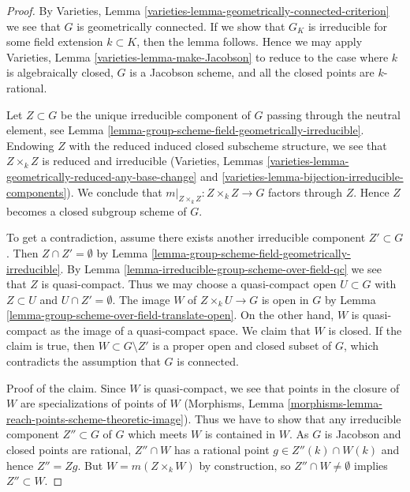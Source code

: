 \begin{proof}
By Varieties, Lemma \ref{varieties-lemma-geometrically-connected-criterion}
we see that $G$ is geometrically connected. If we show that $G_K$
is irreducible for some field extension $k \subset K$, then
the lemma follows. Hence we may apply
Varieties, Lemma \ref{varieties-lemma-make-Jacobson}
to reduce to the case where $k$ is algebraically closed,
$G$ is a Jacobson scheme, and all the closed points are $k$-rational.

\medskip\noindent
Let $Z \subset G$ be the unique irreducible component of $G$ passing
through the neutral element, see
Lemma \ref{lemma-group-scheme-field-geometrically-irreducible}.
Endowing $Z$ with the reduced induced closed subscheme structure,
we see that $Z \times_k Z$ is reduced and irreducible
(Varieties, Lemmas
\ref{varieties-lemma-geometrically-reduced-any-base-change} and
\ref{varieties-lemma-bijection-irreducible-components}).
We conclude that $m|_{Z \times_k Z} : Z \times_k Z \to G$ factors
through $Z$. Hence $Z$ becomes a closed subgroup scheme of $G$.

\medskip\noindent
To get a contradiction, assume there exists another irreducible
component $Z' \subset G$. Then $Z \cap Z' = \emptyset$ by
Lemma \ref{lemma-group-scheme-field-geometrically-irreducible}.
By Lemma \ref{lemma-irreducible-group-scheme-over-field-qc}
we see that $Z$ is quasi-compact. Thus we may choose a quasi-compact open
$U \subset G$ with $Z \subset U$ and $U \cap Z' = \emptyset$.
The image $W$ of $Z \times_k U \to G$ is open in $G$ by
Lemma \ref{lemma-group-scheme-over-field-translate-open}.
On the other hand, $W$ is quasi-compact as the image of a
quasi-compact space. We claim that $W$ is closed.
If the claim is true, then $W \subset G \setminus Z'$ is a proper open
and closed subset of $G$, which contradicts the assumption that
$G$ is connected.

\medskip\noindent
Proof of the claim. Since $W$ is quasi-compact, we see that
points in the closure of $W$ are specializations of points of $W$
(Morphisms, Lemma \ref{morphisms-lemma-reach-points-scheme-theoretic-image}).
Thus we have to show that any irreducible
component $Z'' \subset G$ of $G$ which meets $W$ is contained in $W$.
As $G$ is Jacobson and closed points are rational,
$Z'' \cap W$ has a rational point
$g \in Z''(k) \cap W(k)$ and hence $Z'' = Zg$. But $W = m(Z \times_k W)$
by construction, so $Z'' \cap W \not = \emptyset$ implies
$Z'' \subset W$.
\end{proof}

